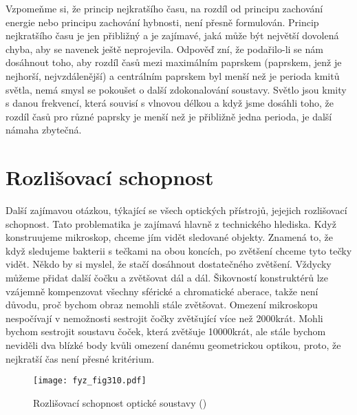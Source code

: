 {    Vzpomeňme si, že princip nejkratšího času, na rozdíl od principu zachování energie nebo 
    principu zachování hybnosti, není přesně formulován. Princip nejkratšího času je jen přibližný 
    a je zajímavé, jaká může být největší dovolená chyba, aby se navenek ještě neprojevila. Odpověď 
    zní, že podařilo-li se nám dosáhnout toho, aby rozdíl časů mezi maximálním paprskem (paprskem, 
    jenž je nejhorší, nejvzdálenější) a centrálním paprskem byl menší než je perioda kmitů světla, 
    nemá smysl se pokoušet o další zdokonalování soustavy. Světlo jsou kmity s danou frekvencí, 
    která souvisí s vlnovou délkou a když jsme dosáhli toho, že rozdíl časů pro různé paprsky je 
    menší než je přibližně jedna perioda, je další námaha zbytečná.
  
  \section{Rozlišovací schopnost}\label{fyz:IchapXXVIIsecVII}
    Další zajímavou otázkou, týkající se všech optických přístrojů, jejejich rozlišovací schopnost. 
    Tato problematika je zajímavá hlavně z technického hlediska. Když konstruujeme mikroskop, 
    chceme jím vidět sledované objekty. Znamená to, že když sledujeme bakterii s tečkami na obou 
    koncích, po zvětšení chceme tyto tečky vidět. Někdo by si myslel, že stačí dosáhnout 
    dostatečného zvětšení. Vždycky můžeme přidat další čočku a zvětšovat dál a dál. Šikovností 
    konstruktérů lze vzájemně kompenzovat všechny sférické a chromatické aberace, takže není 
    důvodu, proč bychom obraz nemohli stále zvětšovat. Omezení mikroskopu nespočívají v nemožnosti 
    sestrojit čočky zvětšující více než \num{2000}krát. Mohli bychom sestrojit soustavu čoček, 
    která zvětšuje \num{10 000}krát, ale stále bychom neviděli dva blízké body kvůli omezení danému 
    geometrickou optikou, proto, že nejkratší čas není přesné kritérium.
    
    \begin{figure}[ht!] %
      \centering
      \texttt{[image: fyz\_fig310.pdf]}
      \caption{Rozlišovací schopnost optické soustavy
               (\cite[s.~355]{Feynman01})}
      \label{fyz:fig310}
    \end{figure}
    
}
